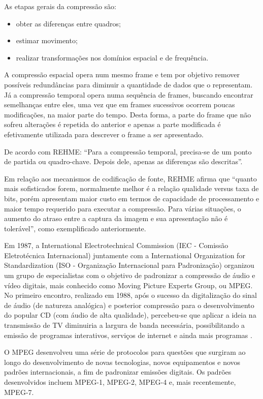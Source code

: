 As etapas gerais da compressão são:

\begin{itemize}
	\item obter as diferenças entre quadros;
	\item estimar movimento;
	\item realizar transformações nos domínios espacial e de frequência.
\end{itemize}

A compressão espacial opera num mesmo frame e tem por objetivo remover possíveis redundâncias para diminuir a quantidade de dados que o representam. Já a compressão temporal opera numa sequência de frames, buscando encontrar semelhanças entre eles, uma vez que em frames sucessivos ocorrem poucas modificações, na maior parte do tempo. Desta forma, a parte do frame que não sofreu alterações é repetida do anterior e apenas a parte modificada é efetivamente utilizada para descrever o frame a ser apresentado.

De acordo com REHME: “Para a compressão temporal, precisa-se de um ponto de partida ou quadro-chave. Depois dele, apenas as diferenças são descritas”.

Em relação aos mecanismos de codificação de fonte, REHME afirma que “quanto mais sofisticados forem, normalmente melhor é a relação qualidade versus taxa de bits, porém apresentam maior custo em termos de capacidade de processamento e maior tempo requerido para executar a compressão. Para várias situações, o aumento do atraso entre a captura da imagem e sua apresentação não é tolerável”, como exemplificado anteriormente.

Em 1987, a International Electrotechnical Commission (IEC - Comissão Eletrotécnica Internacional) juntamente com a International Organization for Standardization (ISO - Organização Internacional para Padronização) organizou um grupo de especialistas com o objetivo de padronizar a compressão de áudio e vídeo digitais, mais conhecido como Moving Picture Experts Group, ou MPEG. No primeiro encontro, realizado em 1988, após o sucesso da digitalização do sinal de áudio (de natureza analógica) e posterior compressão para o desenvolvimento do popular CD (com áudio de alta qualidade), percebeu-se que aplicar a ideia na transmissão de TV diminuiria a largura de banda necessária, possibilitando a emissão de programas interativos, serviços de internet e ainda mais programas \cite{mpeg2ref}.

O MPEG desenvolveu uma série de protocolos para questões  que surgiram ao longo do desenvolvimento de novas tecnologias, novos equipamentos e novos padrões internacionais, a fim de padronizar emissões digitais. Os padrões desenvolvidos incluem MPEG-1, MPEG-2, MPEG-4 e, mais recentemente, MPEG-7.

